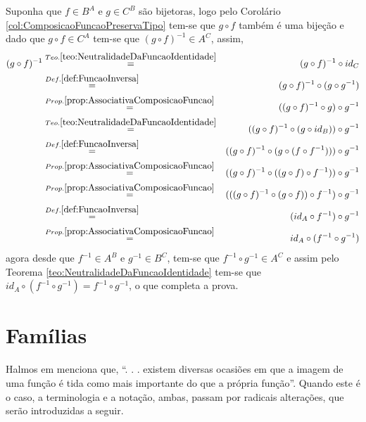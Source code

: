 \begin{prova}
	Suponha que $f \in B^A$ e $g \in C^B$ são bijetoras, logo pelo Corolário \ref{col:ComposicaoFuncaoPreservaTipo} tem-se que $g \circ f$ também é uma bijeção e dado que $g \circ f \in C^A$ tem-se que $(g \circ f)^{-1} \in A^C$, assim,
	\begin{eqnarray*}
		(g \circ f)^{-1} & \stackrel{Teo. \ref{teo:NeutralidadeDaFuncaoIdentidade}}{=} &  (g \circ f)^{-1} \circ id_C\\
		& \stackrel{Def. \ref{def:FuncaoInversa}}{=} & (g \circ f)^{-1} \circ (g \circ g^{-1})\\
		& \stackrel{Prop. \ref{prop:AssociativaComposicaoFuncao}}{=} & ((g \circ f)^{-1} \circ g) \circ g^{-1}\\
		& \stackrel{Teo. \ref{teo:NeutralidadeDaFuncaoIdentidade}}{=} & ((g \circ f)^{-1} \circ (g \circ id_B)) \circ g^{-1}\\
		& \stackrel{Def. \ref{def:FuncaoInversa}}{=} & ((g \circ f)^{-1} \circ (g \circ (f \circ f^{-1}))) \circ g^{-1}\\
		& \stackrel{Prop. \ref{prop:AssociativaComposicaoFuncao}}{=} & ((g \circ f)^{-1} \circ ((g \circ f) \circ f^{-1})) \circ g^{-1}\\
		& \stackrel{Prop. \ref{prop:AssociativaComposicaoFuncao}}{=} & (((g \circ f)^{-1} \circ (g \circ f)) \circ f^{-1}) \circ g^{-1}\\
		& \stackrel{Def. \ref{def:FuncaoInversa}}{=} & (id_A \circ f^{-1}) \circ g^{-1}\\
		& \stackrel{Prop. \ref{prop:AssociativaComposicaoFuncao}}{=} & id_A \circ (f^{-1} \circ g^{-1})
	\end{eqnarray*}
	agora desde que $f^{-1} \in A^B$ e $g^{-1} \in B^C$, tem-se que $f^{-1} \circ g^{-1} \in A^C$ e assim pelo Teorema \ref{teo:NeutralidadeDaFuncaoIdentidade} tem-se que $id_A \circ (f^{-1} \circ g^{-1}) = f^{-1} \circ g^{-1}$, o que completa a prova.
\end{prova}

\section{Famílias}

Halmos em \cite{halmos2001} menciona que, ``. . . existem diversas ocasiões em que a imagem de uma função é tida como mais importante do que a própria função''. Quando este é o caso, a terminologia e a notação, ambas, passam por radicais alterações, que serão introduzidas a seguir.

